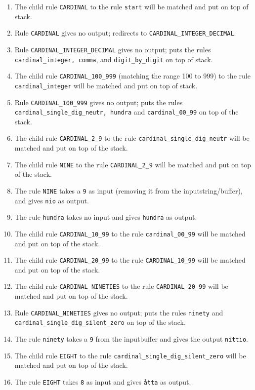 \documentclass[10pt,a4paper]{article}
\begin{document}
\begin{enumerate}
\item The child rule \verb!CARDINAL! to the rule \verb!start! will be matched and put on top of stack.
\item Rule \verb!CARDINAL! gives no output; redirects to \verb!CARDINAL_INTEGER_DECIMAL!.
\item Rule \verb!CARDINAL_INTEGER_DECIMAL! gives no output; puts the rules \verb!cardinal_integer, comma!, and \verb!digit_by_digit! on top of stack.
\item The child rule \verb!CARDINAL_100_999! (matching the range 100 to 999) to the rule \verb!cardinal_integer! will be matched and put on top of stack.
\item Rule \verb!CARDINAL_100_999! gives no output; puts the rules \verb!cardinal_single_dig_neutr, hundra! and \verb!cardinal_00_99! on top of the stack.
\item The child rule \verb!CARDINAL_2_9! to the rule \verb!cardinal_single_dig_neutr! will be matched and put on top of the stack.
\item The child rule \verb!NINE! to the rule \verb!CARDINAL_2_9! will be matched and put on top of the stack.
\item The rule \verb!NINE! takes a \verb!9! as input (removing it from the inputstring/buffer), and gives \verb!nio! as output.
\item The rule \verb!hundra! takes no input and gives \verb!hundra! as output.
\item The child rule \verb!CARDINAL_10_99! to the rule \verb!cardinal_00_99! will be matched and put on top of the stack.
\item The child rule \verb!CARDINAL_20_99! to the rule \verb!CARDINAL_10_99! will be matched and put on top of the stack.
\item The child rule \verb!CARDINAL_NINETIES! to the rule \verb!CARDINAL_20_99! will be matched and put on top of the stack.
\item Rule \verb!CARDINAL_NINETIES! gives no output; puts the rules \verb!ninety! and \verb!cardinal_single_dig_silent_zero! on top of the stack.
\item The rule \verb!ninety! takes a \verb!9! from the inputbuffer and gives the output \verb!nittio!.
\item The child rule \verb!EIGHT! to the rule \verb!cardinal_single_dig_silent_zero! will be matched and put on top of the stack.
\item The rule \verb!EIGHT! takes \verb!8! as input and gives \verb!åtta! as output.

\end{enumerate}
\end{document}

